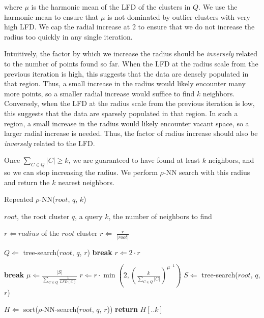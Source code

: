 where $\mu$ is the harmonic mean of the LFD of the clusters in $Q$.
We use the harmonic mean to ensure that $\mu$ is not dominated by outlier clusters with very high LFD.
We cap the radial increase at 2 to ensure that we do not increase the radius too quickly in any single iteration.

Intuitively, the factor by which we increase the radius should be \textit{inversely} related to the number of points found so far.
When the LFD at the radius scale from the previous iteration is high, this suggests that the data are densely populated in that region.
Thus, a small increase in the radius would likely encounter many more points, so a smaller radial increase would suffice to find $k$ neighbors.
Conversely, when the LFD at the radius scale from the previous iteration is low, this suggests that the data are sparsely populated in that region.
In such a region, a small increase in the radius would likely encounter vacant space, so a larger radial increase is needed.
Thus, the factor of radius increase should also be \textit{inversely} related to the LFD.

Once $\sum_{C \in Q} |C| \geq k$, we are guaranteed to have found at least $k$ neighbors, and so we can stop increasing the radius.
We perform $\rho$-NN search with this radius and return the $k$ nearest neighbors.

\begin{algorithm} %
    \caption{Repeated $\rho$-NN($root$, $q$, $k$)} %
    \label{alg:methods:repeated-rnn} %
    \begin{tiny}
    \begin{algorithmic}[0] %
        \Require $root$, the root cluster
        \Require $q$, a query
        \Require $k$, the number of neighbors to find

        \State $r \Leftarrow radius$ of the $root$ cluster
        \State $r \Leftarrow$ $\frac{r}{|root|}$

        \Loop
            \State $Q \Leftarrow$ tree-search($root$, $q$, $r$)
                \State \textbf{break}
            \EndIf
            \State $r \Leftarrow 2 \cdot r$
        \EndLoop

        \Loop
                \State \textbf{break}
            \EndIf
            \State $\mu \Leftarrow \frac{|S|}{\sum_{C \in Q} \frac{1}{LFD(C)}}$
            \State $r \Leftarrow r \cdot \min \left( 2, \left( {\frac{k}{\sum_{C \in Q} |C|}} \right)^{\mu^{-1}} \right)$
            \State $S \Leftarrow$ tree-search($root$, $q$, $r$)
        \EndLoop

        \State $H \Leftarrow$ sort($\rho$-NN-search($root$, $q$, $r$))
        \State \textbf{return} $H[.. k]$
    \end{algorithmic}
    \end{tiny}
\end{algorithm}


